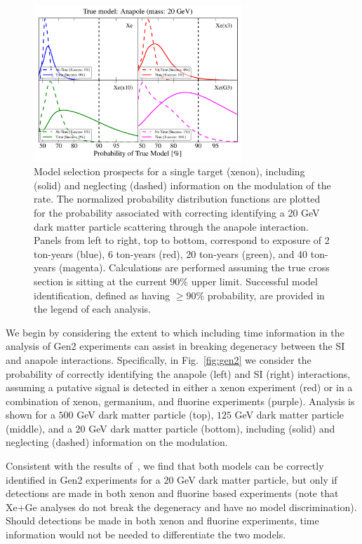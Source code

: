 \documentclass[11pt]{article}
\newcommand{\Fig}[1]{Fig.~\ref{#1}} \newcommand{\Figs}[2]{Figs.~\ref{#1} and \ref{#2}}
\begin{document}
\begin{figure}
\centering
\includegraphics[width=0.7\textwidth]{plots/PDF_20GeV_Anapole_50sims_Xe_Xe3x_Xe10x_XeG3_GF_TNT.pdf}
\caption{\label{fig:20gev_anapole_XeFull_TNT_GF}
Model selection prospects for a single target (xenon), including (solid) and neglecting (dashed) information on the modulation of the rate. The normalized probability distribution functions are plotted for the probability associated with correcting identifying a 20 GeV dark matter particle scattering through the anapole interaction. Panels from left to right, top to bottom, correspond to exposure of 2 ton-years (blue), 6 ton-years (red), 20 ton-years (green), and 40 ton-years (magenta). Calculations are performed assuming the true cross section is sitting at the current $90\%$ upper limit. Successful model identification, defined as having $\geq 90 \%$ probability, are provided in the legend of each analysis.}
\end{figure}




We begin by considering the extent to which including time information in the analysis of Gen2 experiments can assist in breaking degeneracy between the SI and anapole interactions. Specifically, in \Fig{fig:gen2} we consider the probability of correctly identifying the anapole (left) and SI (right) interactions, assuming a putative signal is detected in either a xenon experiment (red) or in a combination of xenon, germanium, and fluorine experiments (purple). Analysis is shown for a $500$ GeV dark matter particle (top), $125$ GeV dark matter particle (middle), and a $20$ GeV dark matter particle (bottom), including (solid) and neglecting (dashed) information on the modulation. 

Consistent with the results of~\cite{Gluscevic:2015sqa}, we find that both models can be correctly identified in Gen2 experiments for a $20$ GeV dark matter particle, but only if detections are made in both xenon and fluorine based experiments (note that Xe+Ge analyses do not break the degeneracy and have no model discrimination). Should detections be made in both xenon and fluorine experiments, time information would not be needed to differentiate the two models.  
\end{document}
